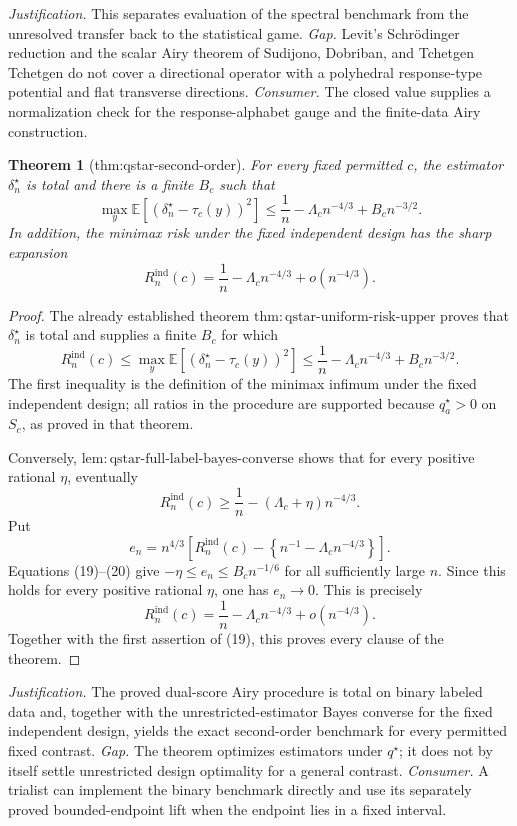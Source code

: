 \documentclass{article}
\newtheorem{theorem}{Theorem}
\begin{document}
\par\smallskip\noindent \textit{Justification.} This separates evaluation of the spectral benchmark from the unresolved transfer back to the statistical game. \textit{Gap.} Levit's Schrödinger reduction and the scalar Airy theorem of Sudijono, Dobriban, and Tchetgen Tchetgen do not cover a directional operator with a polyhedral response-type potential and flat transverse directions. \textit{Consumer.} The closed value supplies a normalization check for the response-alphabet gauge and the finite-data Airy construction.

\begin{theorem}[thm:qstar-second-order]\label{thm:qstar-second-order}
For every fixed permitted \(c\), the estimator \(\delta_n^\star\) is total and there is a finite \(B_c\) such that \[\max_y\mathbb E[(\delta_n^\star-\tau_c(y))^2]\le\frac1n-\Lambda_cn^{-4/3}+B_cn^{-3/2}.\] In addition, the minimax risk under the fixed independent design has the sharp expansion \[R_n^{\mathrm{ind}}(c)=\frac1n-\Lambda_cn^{-4/3}+o(n^{-4/3}).\]
\end{theorem}
\begin{proof}
The already established theorem \(\mathrm{thm:qstar\text{-}uniform\text{-}risk\text{-}upper}\) proves that \(\delta_n^\star\) is total and supplies a finite \(B_c\) for which
\[
R_n^{\mathrm{ind}}(c)
\le\max_y\mathbb E[(\delta_n^\star-\tau_c(y))^2]
\le\frac1n-\Lambda_cn^{-4/3}+B_cn^{-3/2}.
\tag{19}
\]
The first inequality is the definition of the minimax infimum under the fixed independent design; all ratios in the procedure are supported because \(q_a^\star>0\) on \(S_c\), as proved in that theorem.

Conversely, \(\mathrm{lem:qstar\text{-}full\text{-}label\text{-}bayes\text{-}converse}\) shows that for every positive rational \(\eta\), eventually
\[
R_n^{\mathrm{ind}}(c)
\ge\frac1n-(\Lambda_c+\eta)n^{-4/3}.
\tag{20}
\]
Put
\[
e_n=n^{4/3}\left[R_n^{\mathrm{ind}}(c)
-\left\{n^{-1}-\Lambda_cn^{-4/3}\right\}\right].
\]
Equations (19)--(20) give \(-\eta\le e_n\le B_cn^{-1/6}\) for all sufficiently large \(n\).  Since this holds for every positive rational \(\eta\), one has \(e_n\to0\).  This is precisely
\[
R_n^{\mathrm{ind}}(c)
=\frac1n-\Lambda_cn^{-4/3}+o(n^{-4/3}).
\]
Together with the first assertion of (19), this proves every clause of the theorem.
\end{proof}
\par\smallskip\noindent \textit{Justification.} The proved dual-score Airy procedure is total on binary labeled data and, together with the unrestricted-estimator Bayes converse for the fixed independent design, yields the exact second-order benchmark for every permitted fixed contrast. \textit{Gap.} The theorem optimizes estimators under \(q^\star\); it does not by itself settle unrestricted design optimality for a general contrast. \textit{Consumer.} A trialist can implement the binary benchmark directly and use its separately proved bounded-endpoint lift when the endpoint lies in a fixed interval.
\end{document}
